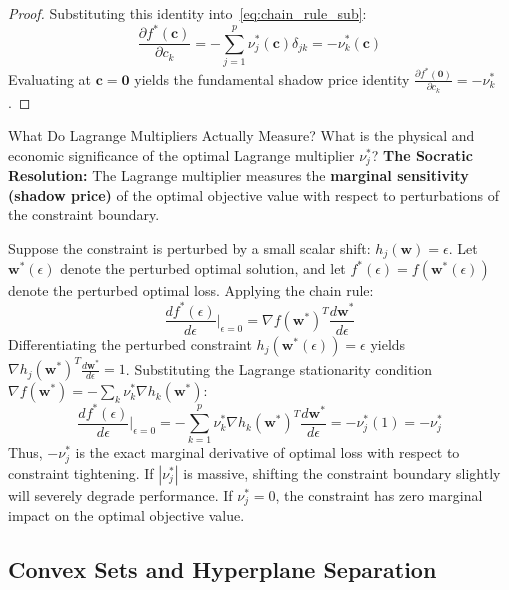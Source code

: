 \begin{proof}
Substituting this identity into~\eqref{eq:chain_rule_sub}:
\begin{equation}
\frac{\partial f^*(\mathbf{c})}{\partial c_k} = -\sum_{j=1}^p \nu_j^*(\mathbf{c}) \delta_{jk} = -\nu_k^*(\mathbf{c})
\end{equation}
Evaluating at $\mathbf{c} = \mathbf{0}$ yields the fundamental shadow price identity $\frac{\partial f^*(\mathbf{0})}{\partial c_k} = -\nu_k^*$.
\end{proof}

\begin{ponderbox}{What Do Lagrange Multipliers Actually Measure?}
What is the physical and economic significance of the optimal Lagrange multiplier $\nu_j^*$?
\tcblower
\textbf{The Socratic Resolution:} The Lagrange multiplier measures the \textbf{marginal sensitivity (shadow price)} of the optimal objective value with respect to perturbations of the constraint boundary. 

Suppose the constraint is perturbed by a small scalar shift: $h_j(\mathbf{w}) = \epsilon$. Let $\mathbf{w}^*(\epsilon)$ denote the perturbed optimal solution, and let $f^*(\epsilon) = f(\mathbf{w}^*(\epsilon))$ denote the perturbed optimal loss. Applying the chain rule:
\begin{equation}
\frac{d f^*(\epsilon)}{d\epsilon}\Big|_{\epsilon = 0} = \nabla f(\mathbf{w}^*)^T \frac{d\mathbf{w}^*}{d\epsilon}
\end{equation}
Differentiating the perturbed constraint $h_j(\mathbf{w}^*(\epsilon)) = \epsilon$ yields $\nabla h_j(\mathbf{w}^*)^T \frac{d\mathbf{w}^*}{d\epsilon} = 1$. Substituting the Lagrange stationarity condition $\nabla f(\mathbf{w}^*) = -\sum_k \nu_k^* \nabla h_k(\mathbf{w}^*)$:
\begin{equation}
\frac{d f^*(\epsilon)}{d\epsilon}\Big|_{\epsilon = 0} = -\sum_{k=1}^p \nu_k^* \nabla h_k(\mathbf{w}^*)^T \frac{d\mathbf{w}^*}{d\epsilon} = -\nu_j^*(1) = -\nu_j^*
\end{equation}
Thus, $-\nu_j^*$ is the exact marginal derivative of optimal loss with respect to constraint tightening. If $|\nu_j^*|$ is massive, shifting the constraint boundary slightly will severely degrade performance. If $\nu_j^* = 0$, the constraint has zero marginal impact on the optimal objective value.
\end{ponderbox}

\subsection{Convex Sets and Hyperplane Separation}

